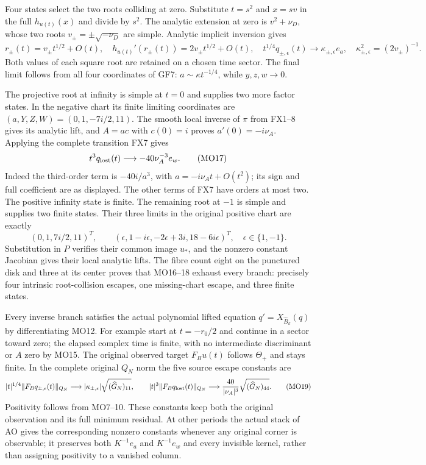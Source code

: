\documentclass[11pt]{article}
\begin{document}
Four states select the two roots colliding at zero. Substitute
$t=s^2$ and $x=sv$ in the full $h_{u(t)}(x)$ and divide by
$s^2$. The analytic extension at zero is $v^2+\nu_D$,
whose two roots $v_\pm=\pm\sqrt{-\nu_D}$ are simple.
Analytic implicit inversion gives
\[
 r_\pm(t)=v_\pm t^{1/2}+O(t),\quad
 h_{u(t)}'(r_\pm(t))=2v_\pm t^{1/2}+O(t),\quad
 t^{1/4}q_{\pm,\epsilon}(t)\longrightarrow\kappa_{\pm,\epsilon}e_a,
 \quad\kappa_{\pm,\epsilon}^2=(2v_\pm)^{-1}.
 \tag{MO16}
\]
Both values of each square root are retained on a chosen time
sector. The final limit follows from all four coordinates of
GF7: $a\sim\kappa t^{-1/4}$, while $y,z,w\to0$.

The projective root at infinity is simple at $t=0$ and supplies
two more factor states. In the negative chart its finite limiting
coordinates are $(a,Y,Z,W)=(0,1,-7i/2,11)$.
The smooth local inverse of $\pi$ from FX1--8 gives its analytic
lift, and $A=ac$ with $c(0)=i$ proves
$a'(0)=-i\nu_A$. Applying the complete transition FX7 gives
\[
 t^3q_{\rm lost}(t)\longrightarrow
                     -40\nu_A^{-3}e_w. \tag{MO17}
\]
Indeed the third-order term is $-40i/a^3$, with
$a=-i\nu_A t+O(t^2)$; its sign and full coefficient are as
displayed. The other terms of FX7 have orders at most two.
The positive infinity state is finite. The remaining root
at $-1$ is simple and supplies two finite states. Their three
limits in the original positive chart are exactly
\[
 (0,1,7i/2,11)^T,\qquad
 (\epsilon,1-i\epsilon,-2\epsilon+3i,18-6i\epsilon)^T,
                       \quad\epsilon\in\{1,-1\}. \tag{MO18}
\]
Substitution in $P$ verifies their common image $u_*$, and
the nonzero constant Jacobian gives their local analytic lifts.
The fibre count eight on the punctured disk and three at its
center proves that MO16--18 exhaust every branch: precisely
four intrinsic root-collision escapes, one missing-chart escape,
and three finite states.

Every inverse branch satisfies the actual polynomial lifted
equation $q'=X_{\widehat B_k}(q)$ by differentiating MO12.
For example start at $t=-r_0/2$ and continue in a sector toward
zero; the elapsed complex time is finite, with no intermediate
discriminant or $A$ zero by MO15. The original observed target
$F_Bu(t)$ follows $\Theta_+$ and stays finite. In the complete
original $Q_N$ norm the five source escape constants are
\[
 |t|^{1/4}\|F_Bq_{\pm,\epsilon}(t)\|_{Q_N}
       \longrightarrow|\kappa_{\pm,\epsilon}|
                             \sqrt{(\widehat G_N)_{11}},\qquad
 |t|^3\|F_Bq_{\rm lost}(t)\|_{Q_N}
       \longrightarrow\frac{40}{|\nu_A|^3}
                             \sqrt{(\widehat G_N)_{44}}.
 \tag{MO19}
\]
Positivity follows from MO7--10. These constants keep both
the original observation and its full minimum residual.
At other periods the actual stack of AO gives the corresponding
nonzero constants whenever any original corner is observable;
it preserves both $K^{-1}e_a$ and $K^{-1}e_w$ and every invisible
kernel, rather than assigning positivity to a vanished column.
\end{document}
